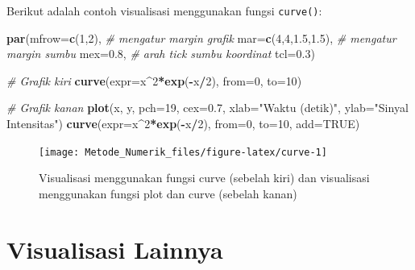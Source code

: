 \documentclass[]{book}
\newenvironment{Shaded}{\begin{snugshade}}{\end{snugshade}}
\newcommand{\CommentTok}[1]{\textcolor[rgb]{0.56,0.35,0.01}{\textit{#1}}}
\newcommand{\DataTypeTok}[1]{\textcolor[rgb]{0.13,0.29,0.53}{#1}}
\newcommand{\DecValTok}[1]{\textcolor[rgb]{0.00,0.00,0.81}{#1}}
\newcommand{\FloatTok}[1]{\textcolor[rgb]{0.00,0.00,0.81}{#1}}
\newcommand{\KeywordTok}[1]{\textcolor[rgb]{0.13,0.29,0.53}{\textbf{#1}}}
\newcommand{\NormalTok}[1]{#1}
\newcommand{\OperatorTok}[1]{\textcolor[rgb]{0.81,0.36,0.00}{\textbf{#1}}}
\newcommand{\OtherTok}[1]{\textcolor[rgb]{0.56,0.35,0.01}{#1}}
\newcommand{\StringTok}[1]{\textcolor[rgb]{0.31,0.60,0.02}{#1}}
\theoremstyle{definition}
\theoremstyle{definition}
\theoremstyle{definition}
\theoremstyle{remark}
\begin{document}
Berikut adalah contoh visualisasi menggunakan fungsi \texttt{curve()}:

\begin{Shaded}
\begin{Highlighting}[]
\KeywordTok{par}\NormalTok{(}\DataTypeTok{mfrow=}\KeywordTok{c}\NormalTok{(}\DecValTok{1}\NormalTok{,}\DecValTok{2}\NormalTok{),}
    \CommentTok{# mengatur margin grafik}
    \DataTypeTok{mar=}\KeywordTok{c}\NormalTok{(}\DecValTok{4}\NormalTok{,}\DecValTok{4}\NormalTok{,}\FloatTok{1.5}\NormalTok{,}\FloatTok{1.5}\NormalTok{),}
    \CommentTok{# mengatur margin sumbu}
    \DataTypeTok{mex=}\FloatTok{0.8}\NormalTok{,}
    \CommentTok{# arah tick sumbu koordinat}
    \DataTypeTok{tcl=}\FloatTok{0.3}\NormalTok{)}

\CommentTok{# Grafik kiri}
\KeywordTok{curve}\NormalTok{(}\DataTypeTok{expr=}\NormalTok{x}\OperatorTok{^}\DecValTok{2}\OperatorTok{*}\KeywordTok{exp}\NormalTok{(}\OperatorTok{-}\NormalTok{x}\OperatorTok{/}\DecValTok{2}\NormalTok{), }
      \DataTypeTok{from=}\DecValTok{0}\NormalTok{, }\DataTypeTok{to=}\DecValTok{10}\NormalTok{)}

\CommentTok{# Grafik kanan}
\KeywordTok{plot}\NormalTok{(x, y, }\DataTypeTok{pch=}\DecValTok{19}\NormalTok{, }\DataTypeTok{cex=}\FloatTok{0.7}\NormalTok{,}
     \DataTypeTok{xlab=}\StringTok{"Waktu (detik)"}\NormalTok{,}
     \DataTypeTok{ylab=}\StringTok{"Sinyal Intensitas"}\NormalTok{)}
\KeywordTok{curve}\NormalTok{(}\DataTypeTok{expr=}\NormalTok{x}\OperatorTok{^}\DecValTok{2}\OperatorTok{*}\KeywordTok{exp}\NormalTok{(}\OperatorTok{-}\NormalTok{x}\OperatorTok{/}\DecValTok{2}\NormalTok{), }
      \DataTypeTok{from=}\DecValTok{0}\NormalTok{, }\DataTypeTok{to=}\DecValTok{10}\NormalTok{, }\DataTypeTok{add=}\OtherTok{TRUE}\NormalTok{)}
\end{Highlighting}
\end{Shaded}

\begin{figure}

{\centering \texttt{[image: Metode\_Numerik\_files/figure-latex/curve-1]} 

}

\caption{Visualisasi menggunakan fungsi curve (sebelah kiri) dan visualisasi menggunakan fungsi plot dan curve (sebelah kanan)}\label{fig:curve}
\end{figure}

\hypertarget{otherviz}{%
\section{Visualisasi Lainnya}\label{otherviz}}
\end{document}
